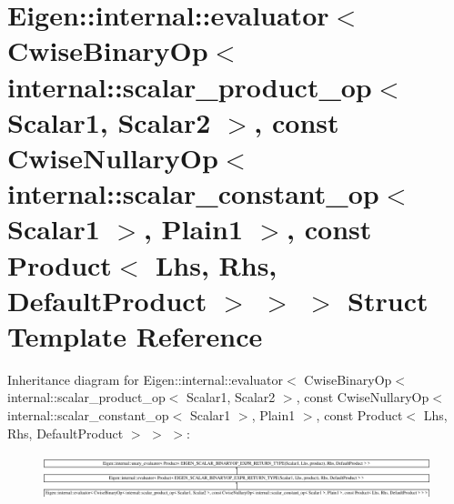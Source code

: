 \hypertarget{struct_eigen_1_1internal_1_1evaluator_3_01_cwise_binary_op_3_01internal_1_1scalar__product__op_321f22566d2663743c7f9d1c3e4e03f69}{}\section{Eigen\+::internal\+::evaluator$<$ Cwise\+Binary\+Op$<$ internal\+::scalar\+\_\+product\+\_\+op$<$ Scalar1, Scalar2 $>$, const Cwise\+Nullary\+Op$<$ internal\+::scalar\+\_\+constant\+\_\+op$<$ Scalar1 $>$, Plain1 $>$, const Product$<$ Lhs, Rhs, Default\+Product $>$ $>$ $>$ Struct Template Reference}
\label{struct_eigen_1_1internal_1_1evaluator_3_01_cwise_binary_op_3_01internal_1_1scalar__product__op_321f22566d2663743c7f9d1c3e4e03f69}
Inheritance diagram for Eigen\+::internal\+::evaluator$<$ Cwise\+Binary\+Op$<$ internal\+::scalar\+\_\+product\+\_\+op$<$ Scalar1, Scalar2 $>$, const Cwise\+Nullary\+Op$<$ internal\+::scalar\+\_\+constant\+\_\+op$<$ Scalar1 $>$, Plain1 $>$, const Product$<$ Lhs, Rhs, Default\+Product $>$ $>$ $>$\+:\begin{figure}[H]
\begin{center}
\leavevmode
\includegraphics[height=1.338645cm]{struct_eigen_1_1internal_1_1evaluator_3_01_cwise_binary_op_3_01internal_1_1scalar__product__op_321f22566d2663743c7f9d1c3e4e03f69}
\end{center}
\end{figure}
